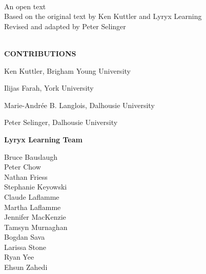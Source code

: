 \thispagestyle{plain}

\begin{center}
  {\fontsize{24pt}{22pt}\selectfont \textcolor{titletextcolour}{\booksubtitle\;\booktitle}} \\
  \bigskip  
  {\fontsize{18pt}{20pt}\selectfont An open text} \\
  \bigskip
  {\fontsize{16pt}{20pt}\selectfont Based on the original text by Ken Kuttler and Lyryx Learning} \\
  \smallskip
  {\fontsize{16pt}{20pt}\selectfont Revised and adapted by Peter Selinger} \\
  \bigskip
  {\fontsize{16pt}{20pt}\selectfont \edition} \\
\end{center}

\setlength{\parskip}{0pt}

\vfill

\begin{center}
\fontsize{14pt}{16pt}\selectfont\textcolor{titletextcolour}{\textbf{CONTRIBUTIONS}}
\end{center}

{\small

\begin{center}
Ken Kuttler, Brigham Young University
\bigskip

Ilijas Farah, York University
\smallskip

Marie-Andr\'ee B. Langlois, Dalhousie University
\smallskip

Peter Selinger, Dalhousie University

\bigskip
\textbf{Lyryx Learning Team}
\vspace{-1em}

\begin{multicols}{2}
Bruce Bauslaugh \\
Peter Chow \\
Nathan Friess \\
Stephanie Keyowski \\
Claude Laflamme \\
Martha Laflamme \\ 
Jennifer MacKenzie \\
Tamsyn Murnaghan \\
Bogdan Sava \\
Larissa Stone \\
Ryan Yee\\
Ehsun Zahedi\\
\end{multicols}

\end{center}

}

